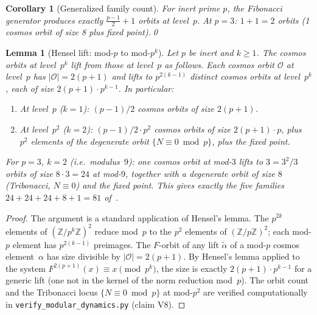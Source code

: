\documentclass[12pt]{article}
\newtheorem{lemma}[theorem]{Lemma}
\newtheorem{corollary}[theorem]{Corollary}
\begin{document}
\begin{corollary}[Generalized family count]
For inert prime $p$, the Fibonacci generator produces exactly
$\tfrac{p-1}{2}+1$ orbits at level~$p$.
At $p=3$: $1+1=2$ orbits (1 cosmos orbit of size 8 plus fixed point).\qed
\end{corollary}

\begin{lemma}[Hensel lift: mod-$p$ to mod-$p^k$]\label{lem:hensel}
Let $p$ be inert and $k\geq1$.  The cosmos orbits at level~$p^k$ lift from those at
level~$p$ as follows.  Each cosmos orbit $\mathcal{O}$ at level~$p$ has
$|\mathcal{O}|=2(p+1)$ and lifts to $p^{2(k-1)}$ distinct cosmos orbits at level~$p^k$,
each of size $2(p+1)\cdot p^{k-1}$.  In particular:
\begin{enumerate}
\item At level~$p$ ($k=1$): $(p-1)/2$ cosmos orbits of size $2(p+1)$.
\item At level~$p^2$ ($k=2$): $(p-1)/2\cdot p^2$ cosmos orbits of size $2(p+1)\cdot p$,
  plus $p^2$ elements of the degenerate orbit $\{N\equiv0\bmod p\}$, plus the fixed point.
\end{enumerate}
For $p=3$, $k=2$ (i.e.\ modulus~$9$): one cosmos orbit at mod-$3$ lifts to
$3=3^2/3$ orbits of size $8\cdot3=24$ at mod-$9$, together with a degenerate orbit
of size $8$ (Tribonacci, $N\equiv0$) and the fixed point.  This gives exactly
the five families $24+24+24+8+1=81$ of~\cite{pyth-families}.
\end{lemma}

\begin{proof}
The argument is a standard application of Hensel's lemma.  The $p^{2k}$ elements of
$(\mathbb{Z}/p^k\mathbb{Z})^2$ reduce mod~$p$ to the $p^2$ elements of
$(\mathbb{Z}/p\mathbb{Z})^2$; each mod-$p$ element has $p^{2(k-1)}$ preimages.
The $F$-orbit of any lift $\tilde\alpha$ of a mod-$p$ cosmos element~$\alpha$
has size divisible by $|\mathcal{O}|=2(p+1)$.  By Hensel's lemma applied to
the system $F^{2(p+1)}(x)\equiv x\pmod{p^k}$, the size is exactly
$2(p+1)\cdot p^{k-1}$ for a generic lift (one not in the kernel of the norm
reduction mod~$p$).
The orbit count and the Tribonacci locus $\{N\equiv0\bmod p\}$ at mod-$p^2$ are
verified computationally in \texttt{verify\_modular\_dynamics.py} (claim V8).
\end{proof}
\end{document}
